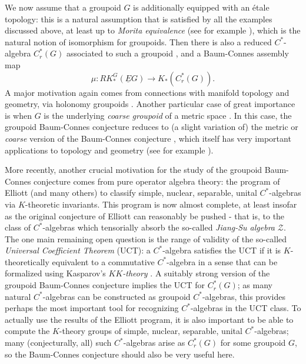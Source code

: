We now assume that a groupoid $G$ is additionally equipped with an \'{e}tale topology: this is a natural assumption that is satisfied by all the examples discussed above, at least up to \emph{Morita equivalence} (see for example \cite{Sims:2012fk}), which is the natural notion of isomorphism for groupoids.   Then there is also a reduced $C^*$-algebra $C^*_r(G)$ associated to such a groupoid \cite{Renault:2009zr}, and a Baum-Connes assembly map \cite{Tu:1999qm} 
$$
\mu:RK_*^G(\underline{E}G)\to K_*(C^*_r(G)).
$$
A major motivation again comes from connections with manifold topology and geometry, via holonomy groupoids \cite{Baum:2000ez,Connes:1982ss}.  Another particular case of great importance is when $G$ is the underlying \emph{coarse groupoid} of a metric space \cite{Skandalis:2002ng}.  In this case, the groupoid Baum-Connes conjecture reduces to (a slight variation of) the metric or \emph{coarse} version of the Baum-Connes conjecture \cite{Higson:1995fv}, which itself has very important applications to topology and geometry (see for example \cite{Yu:200ve}).  

More recently, another crucial motivation for the study of the groupoid Baum-Connes conjecture comes from pure operator algebra theory: the program of Elliott \cite{Elliott:1995dq} (and many others) to classify simple, nuclear, separable, unital $C^*$-algebras via $K$-theoretic invariants.  This program is now almost complete, at least insofar as the original conjecture of Elliott can reasonably be pushed - that is, to the class of $C^*$-algebras which tensorially absorb the so-called \emph{Jiang-Su algebra} $\mathcal{Z}$.  The one main remaining open question is the range of validity of the so-called \emph{Universal Coefficient Theorem} (UCT): a $C^*$-algebra satisfies the UCT if it is $K$-theoretically equivalent to a commutative $C^*$-algebra in a sense that can be formalized using Kasparov's \emph{$KK$-theory} \cite{Rosenberg:1987bh}.  A suitably strong version of the groupoid Baum-Connes conjecture implies the UCT for $C^*_r(G)$; as many natural $C^*$-algebras can be constructed as groupoid $C^*$-algebras, this provides perhaps the most important tool for recognizing $C^*$-algebras in the UCT class.  To actually use the results of the Elliott program, it is also important to be able to compute the $K$-theory groups of simple, nuclear, separable, unital $C^*$-algebras; many (conjecturally, all) such $C^*$-algebras arise as $C^*_r(G)$ for some groupoid $G$, so the Baum-Connes conjecture should also be very useful here.

